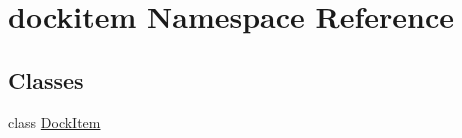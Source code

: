 \hypertarget{namespacedockitem}{}\section{dockitem Namespace Reference}
\label{namespacedockitem}
\subsection*{Classes}
\begin{DoxyCompactItemize}
\item 
class \hyperlink{classdockitem_1_1DockItem}{Dock\+Item}
\end{DoxyCompactItemize}
